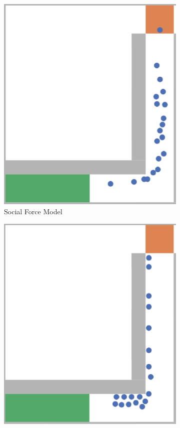 \begin{figure}[H]
\begin{subfigure}[b]{0.3\textwidth}
     \includegraphics[width=\textwidth]{images/2-sfm-rimea6.png}
     \caption{Social Force Model}
     \label{fig: rimea6-sfm}
 \end{subfigure}
 \begin{subfigure}[b]{0.3\textwidth}
      \centering
     \includegraphics[width=\textwidth]{images/2-gnm-rimea6.png}

\end{subfigure}
\end{figure}
